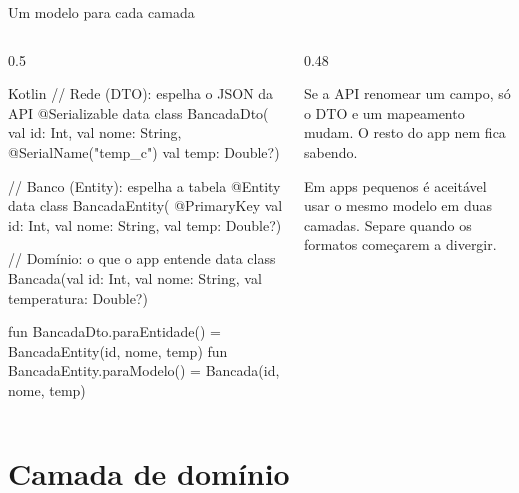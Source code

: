 \documentclass[aspectratio=169,10pt]{beamer}
\begin{document}
\begin{frame}[fragile]{Um modelo para cada camada}
  \begin{columns}[T]
    \begin{column}{0.5\textwidth}
\begin{codigo}[title=Modelos e mapeamentos]{Kotlin}
// Rede (DTO): espelha o JSON da API
@Serializable
data class BancadaDto(
  val id: Int, val nome: String,
  @SerialName("temp_c") val temp: Double?)

// Banco (Entity): espelha a tabela
@Entity data class BancadaEntity(
  @PrimaryKey val id: Int, val nome: String,
  val temp: Double?)

// Domínio: o que o app entende
data class Bancada(val id: Int, val nome: String,
  val temperatura: Double?)

fun BancadaDto.paraEntidade() =
  BancadaEntity(id, nome, temp)
fun BancadaEntity.paraModelo() =
  Bancada(id, nome, temp)
\end{codigo}
    \end{column}
    \begin{column}{0.48\textwidth}
      \centering
      \begin{conceito}
        Se a API renomear um campo, só o DTO e um mapeamento mudam. O resto do app nem fica sabendo.
      \end{conceito}
      \begin{dica}
        Em apps pequenos é aceitável usar o mesmo modelo em duas camadas. Separe quando os formatos começarem a divergir.
      \end{dica}
    \end{column}
  \end{columns}
\end{frame}

\section{Camada de domínio}
\end{document}
